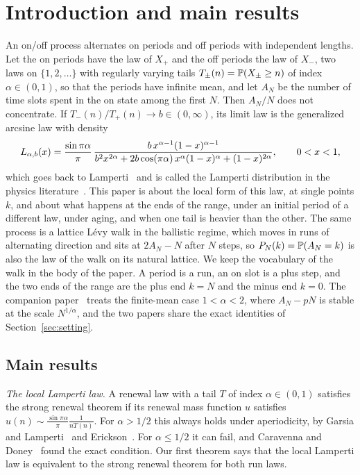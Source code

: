 \section{Introduction and main results}\label{sec:intro}

An on/off process alternates on periods and off periods with independent lengths. Let
the on periods have the law of $X_\plus$ and the off periods the law of $X_\minus$, two laws
on $\{1,2,\dots\}$ with regularly varying tails $T_\pm(n)=\mathbb{P}(X_\pm\ge n)$ of index
$\alpha\in(0,1)$, so that the periods have infinite mean, and let $A_N$ be the number of
time slots spent in the on state among the first $N$. Then $A_N/N$ does not concentrate. If
$T_\minus(n)/T_\plus(n)\to b\in(0,\infty)$, its limit law is the generalized arcsine law with
density
\begin{equation}\label{eq:lamperti-intro}
 L_{\alpha,b}(x)=\frac{\sin\pi\alpha}{\pi}\,
 \frac{b\,x^{\alpha-1}(1-x)^{\alpha-1}}{b^2x^{2\alpha}+2b\cos(\pi\alpha)\,x^\alpha(1-x)^\alpha+(1-x)^{2\alpha}},
 \qquad 0<x<1,
\end{equation}
which goes back to Lamperti~\cite{lamperti1958} and is called the Lamperti distribution in
the physics literature~\cite{margolinbarkai2006,zdk2015}. This paper is about the local form
of this law, at single points $k$, and about what happens at the ends of the range, under an
initial period of a different law, under aging, and when one tail is heavier than the other.
The same process is a lattice L\'evy walk in the ballistic regime, which moves in runs of
alternating direction and sits at $2A_N-N$ after $N$ steps, so $P_N(k)=\mathbb{P}(A_N=k)$ is also
the law of the walk on its natural lattice. We keep the vocabulary of the walk in the body
of the paper. A period is a run, an on slot is a plus step, and the two ends of the range
are the plus end $k=N$ and the minus end $k=0$. The companion paper~\cite{paperF} treats the
finite-mean case $1<\alpha<2$, where $A_N-pN$ is stable at the scale $N^{1/\alpha}$, and the two
papers share the exact identities of Section~\ref{sec:setting}.

\subsection{Main results}\label{sec:intro-results}

\emph{The local Lamperti law.} A renewal law with a tail $T$ of index $\alpha\in(0,1)$
satisfies the strong renewal theorem if its renewal mass function $u$ satisfies
$u(n)\sim\frac{\sin\pi\alpha}\pi\frac1{nT(n)}$. For $\alpha>1/2$ this always holds under
aperiodicity, by Garsia and Lamperti~\cite{garsialamperti1963} and
Erickson~\cite{erickson1970}. For $\alpha\le1/2$ it can fail, and Caravenna and
Doney~\cite{caravennadoney2019} found the exact condition. Our first theorem says that the
local Lamperti law is equivalent to the strong renewal theorem for both run laws.

